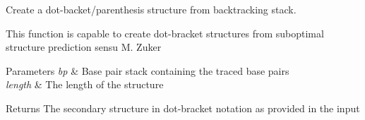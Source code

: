 Create a dot-\/backet/parenthesis structure from backtracking stack. 

This function is capable to create dot-\/bracket structures from suboptimal structure prediction sensu M. Zuker


\begin{DoxyParams}{Parameters}
{\em bp} & Base pair stack containing the traced base pairs \\
\hline
{\em length} & The length of the structure \\
\hline
\end{DoxyParams}
\begin{DoxyReturn}{Returns}
The secondary structure in dot-\/bracket notation as provided in the input 
\end{DoxyReturn}
